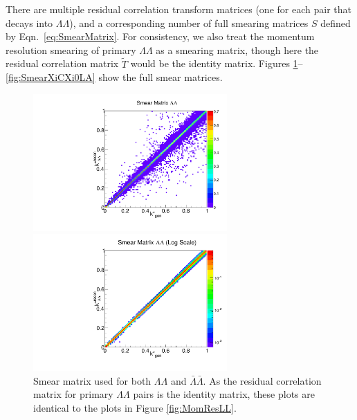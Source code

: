 There are multiple residual correlation transform matrices (one for each pair that decays into $\Lambda\Lambda$), and a corresponding number of full smearing matrices $S$ defined by Eqn.\ \ref{eq:SmearMatrix}.
For consistency, we also treat the momentum resolution smearing of primary $\Lambda\Lambda$ as a smearing matrix, though here the residual correlation matrix $\tilde{T}$ would be the identity matrix. 
Figures \ref{fig:SmearLLAA}--\ref{fig:SmearXiCXi0LA} show the full smear matrices.

\begin{figure}[ht]
\begin{minipage}{17.5pc}
\includegraphics[width=17.5pc]{Figures/SmearMatrices/2016-7-19-SmearMatrixLambdaLambdaNormLLAA.pdf}
\end{minipage}\hspace{0.5pc}
\begin{minipage}{17.5pc}
\includegraphics[width=17.5pc]{Figures/SmearMatrices/2016-7-19-SmearMatrixLambdaLambdaNormLLAALog.pdf}
\end{minipage} 
\caption[Smear matrix -- $\Lambda\Lambda$]{\label{fig:SmearLLAA} 
Smear matrix used for both $\Lambda\Lambda$ and $\bar{\Lambda}\bar{\Lambda}$. As the residual correlation matrix for primary $\Lambda\Lambda$ pairs is the identity matrix, these plots are identical to the plots in Figure \ref{fig:MomResLL}.}
\end{figure}


